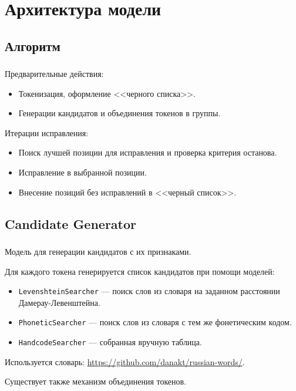 \documentclass[t]{beamer}  %
\begin{document}
\section{Архитектура модели}
\subsection{Алгоритм}
\begin{frame}
	\frametitle{\insertsection} 
	\framesubtitle{\insertsubsection}
		
		Предварительные действия:
		\begin{itemize}
			\item Токенизация, оформление <<черного списка>>.
			\item Генерации кандидатов и объединения токенов в группы.
		\end{itemize}
		
		Итерации исправления:
			\begin{itemize}
				\item Поиск лучшей позиции для исправления и проверка критерия останова.
				\item Исправление в выбранной позиции.
				\item Внесение позиций без исправлений в <<черный список>>.
			\end{itemize}
\end{frame}

\subsection{Candidate Generator}
\begin{frame}
	\frametitle{\insertsection} 
	\framesubtitle{\insertsubsection}
	Модель для генерации кандидатов с их признаками. 
	
	Для каждого токена генерируется список кандидатов при помощи моделей:
	\begin{itemize}
		\item \texttt{LevenshteinSearcher}  --- поиск слов из словаря на заданном расстоянии Дамерау-Левенштейна.
		\item \texttt{PhoneticSearcher} --- поиск слов из словаря с тем же фонетическим кодом.
		\item \texttt{HandcodeSearcher} --- собранная вручную таблица.
	\end{itemize}

	Используется словарь: \url{https://github.com/danakt/russian-words/}.
	
	Существует также механизм объединения токенов.
\end{frame}
\end{document}
